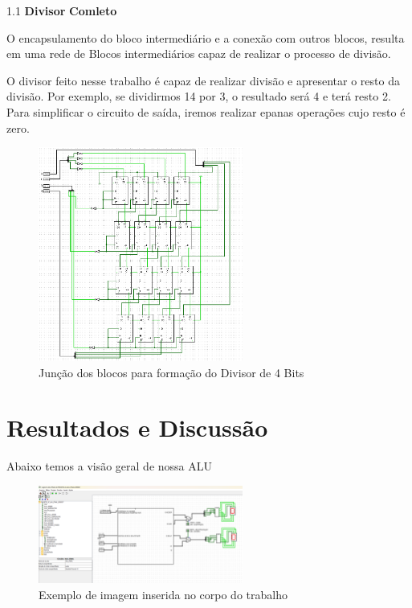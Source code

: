 \documentclass[
12pt,
openright,
oneside,
a4paper,
chapter=TITLE,
english,
brazil,
colorlinks=true,
linkcolor=blue,
citecolor=blue,
filecolor=magenta,
urlcolor=blue
]{abntex2}
\begin{document}
 1.1 \textbf{Divisor} \textbf{Comleto}

   O encapsulamento do bloco intermediário e a conexão com outros blocos, resulta em uma rede de Blocos intermediários capaz de realizar o processo de divisão.

   O divisor feito nesse trabalho é capaz de realizar divisão e apresentar o resto da divisão. Por exemplo, se dividirmos 14 por 3, o resultado será 4 e terá resto 2.
    Para simplificar o circuito de saída, iremos realizar epanas operações cujo resto é zero.

	\begin{figure}[H]
		\centering
		\includegraphics[width=0.6\textwidth]{Divisor_Completo_Final.png}
		\caption{Junção dos blocos para formação do Divisor de 4 Bits}
		\label{fig:exemplo}
	\end{figure}
    
	\chapter{Resultados e Discussão}
	
Abaixo temos a visão geral de nossa ALU	
	\begin{figure}[H]
		\centering
		\includegraphics[width=0.6\textwidth]{ALU_Visao_Geral.png}
		\caption{Exemplo de imagem inserida no corpo do trabalho}
		\label{fig:exemplo}
	\end{figure}
	
\end{document}
